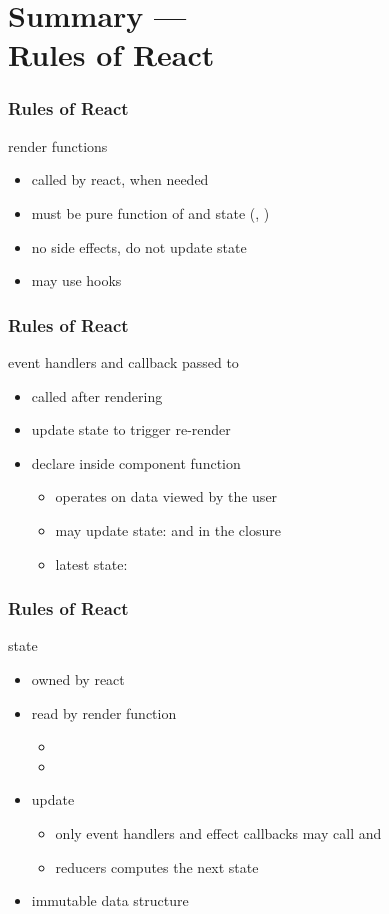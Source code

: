 \section{Summary ---\\ Rules of React}
\begin{frame}[fragile] \frametitle{Rules of React}
render functions
\begin{itemize}
  \item called by react, when needed
  \item must be pure function of  and state (, )
  \item no side effects, do not update state
  \item may use hooks
\end{itemize}
\end{frame}
\begin{frame}[fragile] \frametitle{Rules of React}
event handlers and callback passed to 
\begin{itemize}
  \item called after rendering
  \item update state to trigger re-render
  \item declare inside component function
  \begin{itemize}
    \item operates on data viewed by the user
    \item may update state:  and  in the closure
    \item latest state: 
  \end{itemize}
\end{itemize}
\end{frame}
\begin{frame}[fragile] \frametitle{Rules of React}
state
\begin{itemize}
  \item owned by react
  \item read by render function
  \begin{itemize}
    \item {}
    \item {}
  \end{itemize}
  \item update
  \begin{itemize}
    \item only event handlers and effect callbacks may call  and 
    \item reducers computes the next state
  \end{itemize}
  \item immutable data structure
\end{itemize}
\end{frame}
